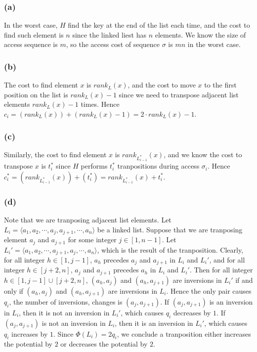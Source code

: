 \subsubsection*{(a)}

In the worst case, $H$ find the key at the end of the list each time,
and the cost to find such element is $n$ since the linked liest has $n$ elements.
We know the size of access sequence is $m$, 
so the access cost of sequence $\sigma$ is $mn$ in the worst case.

\subsubsection*{(b)}

The cost to find element $x$ is $rank_L(x)$,
and the cost to move $x$ to the first position on the list is $rank_L(x) - 1$
since we need to transpose adjacent list elements $rank_L(x) - 1$ times.
Hence $c_i = (rank_L(x)) + (rank_L(x) - 1) = 2 \cdot rank_L(x) - 1$.

\subsubsection*{(c)}

Similarly, the cost to find element $x$ is $rank_{L_{i-1}^*}(x)$,
and we know the cost to transpose $x$ is $t_i^*$ 
since $H$ performs $t_i^*$ tranpositions during access $\sigma_i$.
Hence $c_i^* = (rank_{L_{i-1}^*}(x)) + (t_i^*) = rank_{L_{i-1}^*}(x) + t_i^*$.

\subsubsection*{(d)}

Note that we are tranposing adjacent list elements.
Let $L_i = \langle a_1, a_2, \cdots, a_j, a_{j+1}, \cdots, a_n \rangle$ 
be a linked list.
Suppose that we are tranposing element $a_j$ and $a_{j+1}$
for some integer $j \in [1,n-1]$.
Let $L_i' = \langle a_1, a_2, \cdots, a_{j+1}, a_j, \cdots, a_n \rangle$,
which is the result of the tranposition.
Clearly, for all integer $h \in [1,j-1]$, 
$a_h$ precedes $a_j$ and $a_{j+1}$ in $L_i$ and $L_i'$,
and for all integer $h \in [j+2,n]$, 
$a_j$ and $a_{j+1}$ precedes $a_h$ in $L_i$ and $L_i'$.
Then for all integer $h \in [1,j-1] \cup [j+2,n]$, 
$(a_h,a_j)$ and $(a_h,a_{j+1})$ are inversions in $L_i'$
if and only if 
$(a_h,a_j)$ and $(a_h,a_{j+1})$ are inversions in $L_i$.
Hence the only pair causes $q_i$, the number of inversions, changes
is $(a_j,a_{j+1})$.
If $(a_j,a_{j+1})$ is an inversion in $L_i$,
then it is not an inversion in $L_i'$,
which causes $q_i$ decreases by $1$.
If $(a_j,a_{j+1})$ is not an inversion in $L_i$,
then it is an inversion in $L_i'$,
which causes $q_i$ increases by $1$.
Since $\Phi(L_i) = 2 q_i$,
we conclude a tranposition either increases the potential by $2$
or decreases the potential by $2$.


